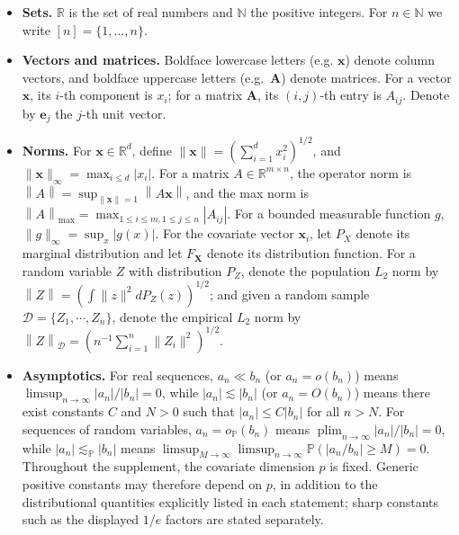 \documentclass[10pt]{article}
\newcommand{\norm}[1]{\left\lVert #1 \right\rVert}
\def\be{\mathbf{e}}
\def\bx{\mathbf{x}}
\def\bX{\mathbf{X}}
\def\P{\mathbb{P}}
\def\reals{\mathbb{R}}
\def\dataD{\mathcal{D}}
\theoremstyle{definition}
\theoremstyle{remark}
\begin{document}
\begingroup
\begin{itemize}%
    \item \textbf{Sets.}
$\mathbb{R}$ is the set of real numbers and $\mathbb{N}$ the positive integers.  
For $n\in\mathbb{N}$ we write $[n]=\{1,\dots,n\}$.

    \item \textbf{Vectors and matrices.}
Boldface lowercase letters (e.g. $\bx$) denote column vectors, and boldface uppercase letters (e.g.\ $\mathbf{A}$) denote matrices.
For a vector $\bx$, its $i$-th component is $x_i$; for a matrix $\mathbf{A}$, its $(i,j)$-th entry is $A_{ij}$. Denote by $\be_j$ the $j$-th unit vector.

    \item \textbf{Norms.}
For $\bx\in\mathbb{R}^d$, define $\|\bx\| = (\sum_{i=1}^{d} x_i^{2})^{1/2}$, and $\|\bx\|_\infty = \max_{i\le d}|x_i|$. For a matrix $A \in \reals^{m \times n}$, the operator norm is $\norm{A} = \sup_{\norm{\bx} = 1} \norm{A\bx}$, and the max norm is $\norm{A}_{\max} = \max_{1 \leq i \leq m, 1 \leq j \leq n} |A_{ij}|$. For a bounded measurable function $g$,
$\|g\|_\infty = \sup_{x}|g(x)|$. For the covariate vector $\bx_i$, let $P_X$ denote its marginal distribution and let $F_{\bX}$ denote its distribution function. For a random variable $Z$ with distribution $P_Z$, denote the population $L_2$ norm by $\norm{Z} = (\int \lVert z \rVert^2 d P_Z(z))^{1/2}$; and given a random sample $\dataD = \{Z_1, \cdots, Z_n\}$, denote the empirical $L_2$ norm by $\norm{Z}_{\dataD} = (n^{-1}\sum_{i = 1}^n \lVert Z_i \rVert^2)^{1/2}$.

    \item \textbf{Asymptotics.}
For real sequences, $a_n \ll b_n$ (or $a_n = o(b_n)$) means $\limsup_{n\to\infty} |a_n|/|b_n| = 0$, while $|a_n| \lesssim |b_n|$ (or $a_n = O(b_n)$) means there exist constants $C$ and $N > 0$ such that $|a_n| \leq C |b_n|$ for all $n > N$. For sequences of random variables, $a_n = o_{\P}(b_n)$ means $\operatorname{plim}_{n \rightarrow \infty}|a_n|/|b_n| = 0$, while $|a_n| \lesssim_{\P} |b_n|$ means $\limsup_{M \rightarrow \infty} \limsup_{n \rightarrow \infty} \P(|a_n/b_n| \geq M) = 0$.
Throughout the supplement, the covariate dimension $p$ is fixed. Generic positive constants may therefore depend on $p$, in addition to the distributional quantities explicitly listed in each statement; sharp constants such as the displayed $1/e$ factors are stated separately.


\end{itemize}
\end{document}
